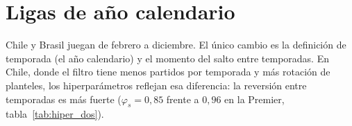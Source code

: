 \section{Ligas de año calendario}

Chile y Brasil juegan de febrero a diciembre. El único cambio es la definición de temporada (el año calendario) y el momento del salto entre temporadas. En Chile, donde el filtro tiene menos partidos por temporada y más rotación de planteles, los hiperparámetros reflejan esa diferencia: la reversión entre temporadas es más fuerte ($\varphi_s=0{,}85$ frente a $0{,}96$ en la Premier, tabla~\ref{tab:hiper_dos}).
